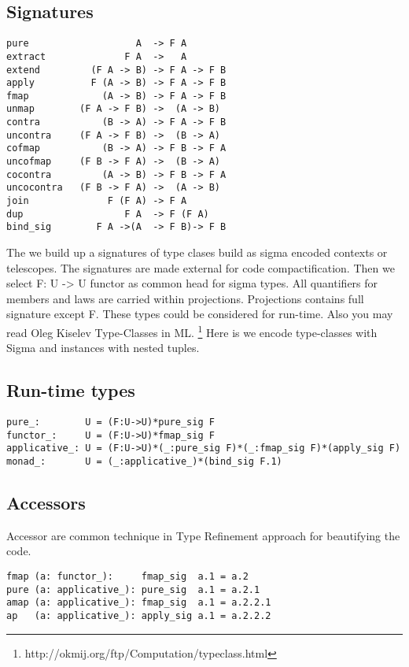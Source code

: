 \documentclass{article}
\begin{document}
\subsection{Signatures}

\begin{lstlisting}[mathescape=true]
pure                   A  -> F A
extract              F A  ->   A
extend         (F A -> B) -> F A -> F B
apply          F (A -> B) -> F A -> F B
fmap             (A -> B) -> F A -> F B
unmap        (F A -> F B) ->  (A -> B)
contra           (B -> A) -> F A -> F B
uncontra     (F A -> F B) ->  (B -> A)
cofmap           (B -> A) -> F B -> F A
uncofmap     (F B -> F A) ->  (B -> A)
cocontra         (A -> B) -> F B -> F A
uncocontra   (F B -> F A) ->  (A -> B)
join              F (F A) -> F A
dup                  F A  -> F (F A)
bind_sig        F A ->(A  -> F B)-> F B
\end{lstlisting}

The we build up a signatures of type clases build as sigma encoded contexts or telescopes.
The signatures are made external for code compactification.
Then we select F: U -> U functor as common head for sigma types.
All quantifiers for members and laws are carried within projections.
Projections contains full signature except F. These types could be considered for run-time.
Also you may read Oleg Kiselev Type-Classes in ML. \footnote{http://okmij.org/ftp/Computation/typeclass.html}
Here is we encode type-classes with Sigma and instances with nested tuples.

\subsection{Run-time types}

\begin{lstlisting}[mathescape=true]
pure_:        U = (F:U->U)*pure_sig F
functor_:     U = (F:U->U)*fmap_sig F
applicative_: U = (F:U->U)*(_:pure_sig F)*(_:fmap_sig F)*(apply_sig F)
monad_:       U = (_:applicative_)*(bind_sig F.1)
\end{lstlisting}

\subsection{Accessors}

Accessor are common technique in Type Refinement approach for beautifying the code.

\begin{lstlisting}[mathescape=true]
fmap (a: functor_):     fmap_sig  a.1 = a.2
pure (a: applicative_): pure_sig  a.1 = a.2.1
amap (a: applicative_): fmap_sig  a.1 = a.2.2.1
ap   (a: applicative_): apply_sig a.1 = a.2.2.2
\end{lstlisting}
\end{document}
